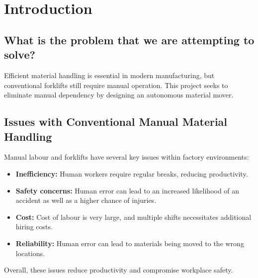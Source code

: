 \documentclass[12pt]{article}
\begin{document}
\section{Introduction}
\subsection{What is the problem that we are attempting to solve?}
Efficient material handling is essential in modern manufacturing, but conventional forklifts still require manual operation. This project seeks to eliminate manual dependency by designing an autonomous material mover.
 
\subsection{Issues with Conventional Manual Material Handling}

Manual labour and forklifts have several key issues within factory environments:

\begin{itemize}
    \item \textbf{Inefficiency:} Human workers require regular breaks, reducing productivity.
    \item \textbf{Safety concerns:} Human error can lead to an increased likelihood of an accident as well as a higher chance of injuries.
    \item \textbf{Cost:} Cost of labour is very large, and multiple shifts necessitates additional hiring costs.
    \item \textbf{Reliability:} Human error can lead to materials being moved to the wrong locations.
\end{itemize}

Overall, these issues reduce productivity and compromise workplace safety.
\end{document}
